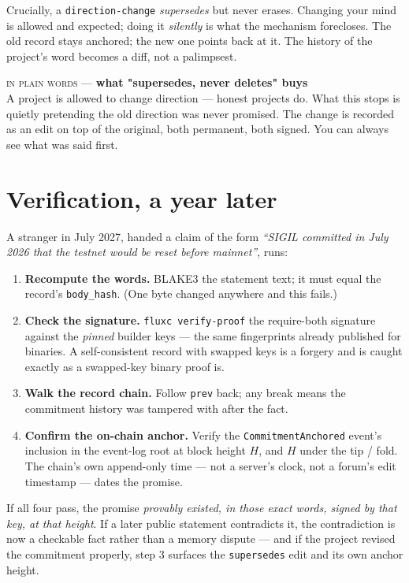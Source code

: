 \documentclass[10pt,a4paper]{article}
\newcommand{\layman}[3]{%
\begin{tcolorbox}[enhanced,
  interior style={left color=#1!9,right color=white},
  colframe=#1!45!slate,boxrule=0.5pt,arc=3pt,
  borderline west={2.5pt}{0pt}{#1},
  left=9pt,right=9pt,top=7pt,bottom=7pt]
{\scriptsize\textcolor{#1}{\textsc{in plain words}}\; — \;\textbf{\small #2}}\\[3pt]
\small #3
\end{tcolorbox}}
\begin{document}
Crucially, a \texttt{direction-change} \emph{supersedes} but never erases. Changing
your mind is allowed and expected; doing it \emph{silently} is what the mechanism
forecloses. The old record stays anchored; the new one points back at it. The history
of the project's word becomes a diff, not a palimpsest.

\layman{sigilviolet}{what "supersedes, never deletes" buys}{A project is allowed to
change direction --- honest projects do. What this stops is quietly pretending the old
direction was never promised. The change is recorded as an edit on top of the original,
both permanent, both signed. You can always see what was said first.}

\section{Verification, a year later}
A stranger in July 2027, handed a claim of the form \emph{``SIGIL committed in July
2026 that the testnet would be reset before mainnet''}, runs:

\begin{enumerate}[leftmargin=1.4em,itemsep=2pt]
\item \textbf{Recompute the words.} BLAKE3 the statement text; it must equal the
  record's \texttt{body\_hash}. (One byte changed anywhere and this fails.)
\item \textbf{Check the signature.} \texttt{fluxc verify-proof} the require-both
  signature against the \emph{pinned} builder keys --- the same fingerprints already
  published for binaries. A self-consistent record with swapped keys is a forgery and
  is caught exactly as a swapped-key binary proof is.
\item \textbf{Walk the record chain.} Follow \texttt{prev} back; any break means the
  commitment history was tampered with after the fact.
\item \textbf{Confirm the on-chain anchor.} Verify the \texttt{CommitmentAnchored}
  event's inclusion in the event-log root at block height $H$, and $H$ under the tip /
  fold. The chain's own append-only time --- not a server's clock, not a forum's edit
  timestamp --- dates the promise.
\end{enumerate}

If all four pass, the promise \emph{provably existed, in those exact words, signed by
that key, at that height}. If a later public statement contradicts it, the
contradiction is now a checkable fact rather than a memory dispute --- and if the
project revised the commitment properly, step 3 surfaces the \texttt{supersedes} edit
and its own anchor height.
\end{document}
